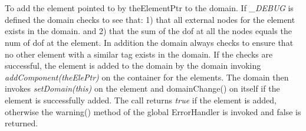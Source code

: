   \\
  \\
To add the element pointed to by theElementPtr to the domain. 
If {\em \_DEBUG} is defined the domain checks to
see that: 1) that all external nodes for the element exists in the
domain. and 2) that the sum of the dof at all the nodes equals the num
of dof at the element. In addition the domain always checks to ensure
that no other element with a similar tag exists in the domain.
If the checks are successful, the element is added to
the domain by the domain invoking {\em addComponent(theElePtr)} on
the container for the elements. The domain then invokes {\em
setDomain(this)} on the element and domainChange() on
itself if the element is successfully added. The call returns {\em
true} if the element is added, otherwise the warning() method of
the global ErrorHandler is invoked and \p false is returned.\\

